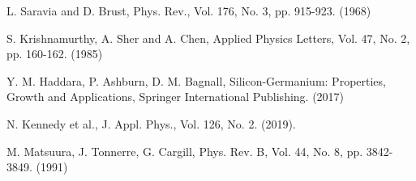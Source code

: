 \documentclass[10pt, twocolumn]{revtex4}    %
\begin{document}
\begin{thebibliography}{}
L. Saravia and D. Brust, Phys. Rev., Vol. 176, No. 3, pp. 915-923. (1968)

S. Krishnamurthy, A. Sher and A. Chen, Applied Physics Letters, Vol. 47, No. 2, pp. 160-162. (1985)

Y. M. Haddara, P. Ashburn, D. M. Bagnall, Silicon-Germanium: Properties, Growth and Applications, Springer International Publishing. (2017)

N. Kennedy et al., J. Appl. Phys., Vol. 126, No. 2. (2019).

M. Matsuura, J. Tonnerre, G. Cargill, Phys. Rev. B, Vol. 44, No. 8, pp. 3842-3849. (1991)
\end{thebibliography}
\end{document}
